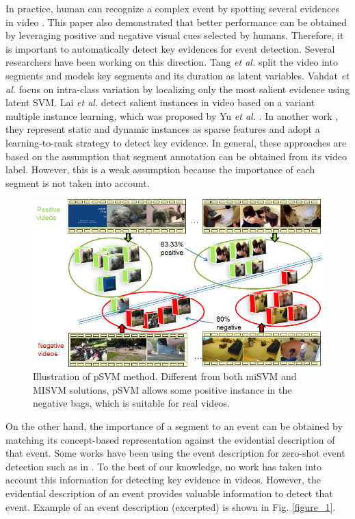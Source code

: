 In practice, human  can recognize a complex event by spotting several evidences in video \cite{bhattacharya2014minimally}. This paper also demonstrated that better performance can be obtained by leveraging positive and negative visual cues selected by humans. Therefore, it is important to automatically detect key evidences for event detection. Several researchers have been working on this direction. Tang \textit{et al.} \cite{tang2012learning} split the video into segments and models key segments and its duration as latent variables. Vahdat \textit{et al.} \cite{vahdat2013compositional} focus on intra-class variation by localizing only the most salient evidence using latent SVM. 
Lai \textit{et al.} \cite{lai2014video} detect salient instances in video based on a variant multiple instance learning,  which was proposed by Yu \textit{et al.} \cite{yu2013propto}. In another work \cite{lai2014recognizing}, they represent static and dynamic instances as sparse features and adopt a learning-to-rank strategy to detect key evidence. In general, these approaches are based on the assumption that segment annotation can be obtained from its video label. However, this is a weak assumption because the importance of each segment is not taken into account. 

\begin{figure}
	\centering
	\includegraphics[width=1\textwidth]{pSVM.png}
	\caption{Illustration of pSVM \cite{lai2014recognizing} method. Different from both miSVM and MISVM solutions, pSVM allows some positive instance in the negative bags, which is suitable for real videos.}
	\label{c5_f_psvm}
\end{figure}

On the other hand, the importance of a segment to an event can be obtained by matching its concept-based representation against the evidential description  of that event. Some works have been using the event description for zero-shot event detection such as in \cite{chen2014event,wu2014zero}. To the best of our knowledge, no work has taken into account this information for detecting key evidence in videos. However, the evidential description of an event provides valuable information to detect that event. Example of an event description (excerpted) is shown in Fig. \ref{figure_1}. 

